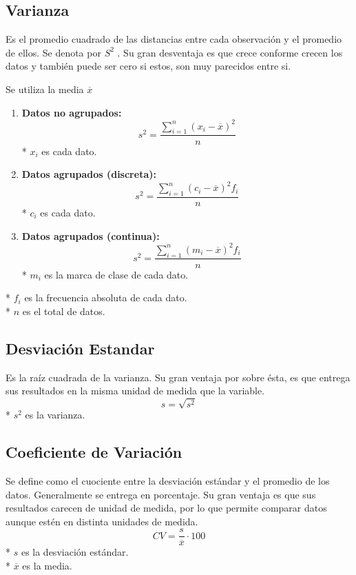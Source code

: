 \documentclass{templateNote}
\begin{document}
\subsection{Varianza}
\indent
Es el promedio cuadrado de las distancias
entre cada observación y el promedio de ellos.
Se denota por $S^2$
. Su gran desventaja es que
crece conforme crecen los datos y también
puede ser cero si estos, son muy parecidos
entre si.

Se utiliza la media $\overline{x}$
\begin{enumerate}
    \item \textbf{Datos no agrupados:}
    \begin{equation*}
        s^2 = \frac{\displaystyle \sum_{i=1}^{n} (x_i - \overline{x})^2}{n}
    \end{equation*}
    * $x_i$ es cada dato.\\
    \item \textbf{Datos agrupados (discreta):}
    \begin{equation*}
        s^2 = \frac{\displaystyle \sum_{i=1}^{n} (c_i - \overline{x})^2 f_i}{n}
    \end{equation*}
    * $c_i$ es cada dato.\\
    \item \textbf{Datos agrupados (continua):}
    \begin{equation*}
        s^2 = \frac{\displaystyle \sum_{i=1}^{n} (m_i - \overline{x})^2 f_i}{n}
    \end{equation*}
    * $m_i$ es la marca de clase de cada dato.
\end{enumerate}
* $f_i$ es la frecuencia absoluta de cada dato.\\
* $n$ es el total de datos.\\

\subsection{Desviación Estandar}
\indent
Es la raíz cuadrada de la varianza. Su gran
ventaja por sobre ésta, es que entrega sus
resultados en la misma unidad de medida que
la variable.
\begin{equation*}
    s = \sqrt{s^2}
\end{equation*}
* $s^2$ es la varianza.\\

\subsection{Coeficiente de Variación}
\indent
Se define como el cuociente entre la
desviación estándar y el promedio de los datos.
Generalmente se entrega en porcentaje. Su
gran ventaja es que sus resultados carecen de
unidad de medida, por lo que permite comparar
datos aunque estén en distinta unidades de
medida.
\begin{equation*}
    CV = \frac{s}{\overline{x}} \cdot 100
\end{equation*}
* $s$ es la desviación estándar.\\
* $\overline{x}$ es la media.\\
\end{document}
